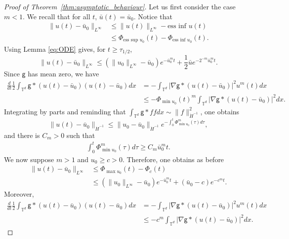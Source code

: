 \documentclass[11pt]{article}
\numberwithin{equation}{section} %
\newcommand{\T}{{\mathbb{T}}}
\newcommand{\g}{{\mathsf{g}}}
\def \hal{\frac{1}{2}}
\def\nab{\nabla}
\begin{document}
\begin{proof}[Proof of Theorem~\ref{thm:asymptotic_behaviour}]
    Let us first consider the case $m<1$. We recall that for all $t$, $\bar{u}(t) = \bar{u}_{0}$. Notice that 
    \begin{align*}
        \| u(t) - \bar{u}_{0}\|_{L^\infty} &\le  \|u(t)\|_{L^\infty}- \text{ess inf } u(t) \\
        &\le \Phi_{\text{ess sup } u_0}(t) - \Phi_{\text{ess inf } u_{0}}(t).
    \end{align*}
    Using Lemma \ref{eq:ODE} gives, for $t\ge \tau_{1/2}$,
    \begin{equation*}
        \| u(t) - \bar{u}_{0}\|_{L^\infty}\le (\|u_{0}\|_{L^\infty} - \bar{u}_{0}) e^{-\bar{u}_{0}^m t} + \hal \bar ue^{-2^{-m}\bar{u}_{0}^m t}.
    \end{equation*}
    Since $\g$ has mean zero, we have
    \begin{align*}
        \frac{d}{dt}\hal\int_{\T^d} \g\ast (u(t)-\bar{u}_{0}) (u(t)-\bar{u}_{0}) dx &=-\int_{\T^d}|\nab\g\ast (u(t)-\bar{u}_{0}) |^2u^m(t) dx \\
        &\le -\Phi_{\min u_{0}}(t)^m\int_{\T^d}|\nab\g\ast (u(t)-\bar{u}_{0})|^2dx.
    \end{align*}
    Integrating by parts and reminding that $\int_{\T^d}\g\ast ffdx \sim \|f\|_{\dot H^{-1}}^2$, one obtains
    \begin{equation*}
        \| u(t)-\bar{u}_{0}\|_{\dot H^{-1}}\le \| u_{0}-\bar{u}_{0}\|_{\dot H^{-1}} e^{-\int_0^t \Phi_{\min u_{0}}^m(\tau)d\tau},
    \end{equation*}
    and there is $C_m >0$ such that
    \begin{align*}
        \int_0^t \Phi_{\min u_{0}}^m(\tau)d\tau \ge C_m \bar{u}_{0}^m t.
    \end{align*}
    We now suppose $m>1$ and $u_{0}\ge c>0$. Therefore, one obtains as before
    \begin{align*}
        \| u(t)-\bar{u}_{0}\|_{L^\infty} &\le \Phi_{\max u_{0}}(t) - \Phi_{c}(t) \\
        &\le (\|u_{0}\|_{L^\infty} - \bar{u}_{0}) e^{-\bar{u}_{0}^m t}  + (\bar{u}_{0}- c) e^{-c^mt}.
    \end{align*}
    Moreover,
    \begin{align*}
        \frac{d}{dt}\hal\int_{\T^d} \g\ast (u(t)-\bar{u}_{0}) (u(t)-\bar{u}_{0}) dx &= -\int_{\T^d}|\nab\g\ast (u(t)-\bar{u}_{0})|^2 u^m(t) dx  \\
        &\le -c^m\int_{\T^d}|\nab\g\ast (u(t)-\bar{u}_{0}) |^2dx.

\end{align*}
\end{proof}
\end{document}
